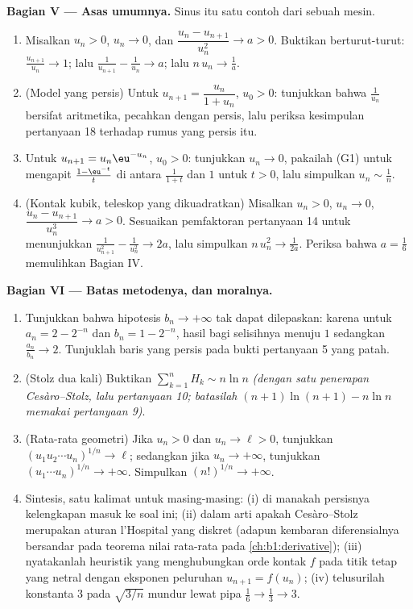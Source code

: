 \begin{problem}[{Soal akhir pekan --- teorema Cesàro--Stolz
dan asimtotik $u_n \sim \sqrt{3/n}$ untuk $u_{n+1} = \sin
u_n$}]
\medskip
\noindent\textbf{Bagian V --- Asas umumnya.} Sinus itu
satu contoh dari sebuah mesin.
\begin{enumerate}[resume]
  \item Misalkan $u_n > 0$, $u_n \to 0$, dan $\dfrac{u_n -
        u_{n+1}}{u_n^{2}} \to a > 0$. Buktikan berturut-turut:
        $\frac{u_{n+1}}{u_n} \to 1$; lalu $\frac{1}{u_{n+1}} -
        \frac{1}{u_n} \to a$; lalu $n\,u_n \to \frac1a$.
  \item (Model yang persis) Untuk $u_{n+1} = \dfrac{u_n}{1 + u_n}$, $u_0
        > 0$: tunjukkan bahwa $\frac{1}{u_n}$ bersifat aritmetika, pecahkan dengan persis,
        lalu periksa kesimpulan pertanyaan 18 terhadap rumus yang persis itu.
  \item Untuk $u_{n+1} = u_n \eu^{-u_n}$, $u_0 > 0$: tunjukkan $u_n \to
        0$, pakailah (G1) untuk mengapit $\frac{1 - \eu^{-t}}{t}$ di antara
        $\frac{1}{1+t}$ dan $1$ untuk $t > 0$, lalu simpulkan $u_n
        \sim \frac 1n$.
  \item (Kontak kubik, teleskop yang dikuadratkan) Misalkan $u_n > 0$, $u_n
        \to 0$, $\dfrac{u_n - u_{n+1}}{u_n^{3}} \to a > 0$.
        Sesuaikan pemfaktoran pertanyaan 14 untuk menunjukkan
        $\frac{1}{u_{n+1}^2} - \frac{1}{u_n^2} \to 2a$, lalu
        simpulkan $n\,u_n^{2} \to \frac{1}{2a}$. Periksa bahwa $a =
        \frac16$ memulihkan Bagian IV.
\end{enumerate}

\medskip
\noindent\textbf{Bagian VI --- Batas metodenya, dan moralnya.}
\begin{enumerate}[resume]
  \item Tunjukkan bahwa hipotesis $b_n \to +\infty$ tak dapat
        dilepaskan: karena untuk $a_n = 2 - 2^{-n}$ dan $b_n = 1 - 2^{-n}$,
        hasil bagi selisihnya menuju $1$ sedangkan $\frac{a_n}
        {b_n} \to 2$. Tunjuklah baris yang persis pada bukti pertanyaan
        5 yang patah.
  \item (Stolz dua kali) Buktikan $\sum_{k=1}^{n} H_k \sim n \ln n$
        \emph{(dengan satu penerapan Cesàro--Stolz, lalu pertanyaan
        10; batasilah $(n+1)\ln(n+1) - n\ln n$ memakai pertanyaan 9)}.
  \item (Rata-rata geometri) Jika $u_n > 0$ dan $u_n \to \ell > 0$,
        tunjukkan $(u_1 u_2 \cdots u_n)^{1/n} \to \ell$; sedangkan jika $u_n \to
        +\infty$, tunjukkan $(u_1 \cdots u_n)^{1/n} \to +\infty$.
        Simpulkan $(n!)^{1/n} \to +\infty$.
  \item Sintesis, satu kalimat untuk masing-masing: (i) di manakah persisnya
        kelengkapan masuk ke soal ini; (ii) dalam arti apakah
        Cesàro--Stolz merupakan aturan l'Hospital yang diskret (adapun kembaran
        diferensialnya bersandar pada teorema nilai rata-rata pada
        \cref{ch:b1:derivative}); (iii) nyatakanlah heuristik yang
        menghubungkan orde kontak $f$ pada titik tetap yang
        netral dengan eksponen peluruhan $u_{n+1} = f(u_n)$;
        (iv) telusurilah konstanta $3$ pada $\sqrt{3/n}$ mundur lewat
        pipa $\frac16 \to \frac13 \to 3$.


\end{enumerate}
\end{problem}
